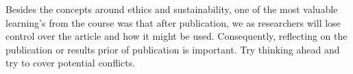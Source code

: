 Besides the concepts around ethics and sustainability, one of the most valuable learning's from the course was that after publication, we as researchers will lose control over the article and how it might be used. Consequently, reflecting on the publication or results prior of publication is important. Try thinking ahead and try to cover potential conflicts.























